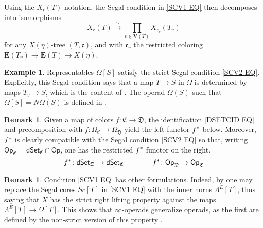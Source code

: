 \documentclass[a4paper,10pt
,draft
]{article}%
\numberwithin{equation}{section}
\numberwithin{figure}{section}
\theoremstyle{definition} %
\newtheorem{example}[equation]{Example}%
\newtheorem{remark}[equation]{Remark}%
\newcommand{\Op}{\mathsf{Op}}%
\newcommand{\dSet}{\mathsf{dSet}}
\newcommand{\1}{\ensuremath{\mathbbm 1}}%
\begin{document}
Using the $X_{\mathfrak c}(T)$ notation, 
the Segal condition in \eqref{SCV1 EQ}
then decomposes into isomorphisms
	\begin{equation}\label{SCV2 EQ}
	X_{\mathfrak c}(T) \xrightarrow{\simeq} \prod_{v \in \boldsymbol{V}(T)} X_{\mathfrak c_v}(T_v)
	\end{equation}
for any $X(\eta)$-tree $(T,\mathfrak{c})$,
and with $\mathfrak{c}_v$
the restricted coloring
$\boldsymbol{E}(T_v) \to \boldsymbol{E}(T) \to X(\eta)$.


\begin{example}\label{OMTSEG EX}
	Representables $\Omega[S]$ satisfy
	the strict Segal condition \eqref{SCV2 EQ}.
	Explicitly, this Segal condition says
	that a map
	$T\to S$ in $\Omega$ is determined by maps
	$T_v\to S$, 
	which is the content of \cite[Prop. 5.11]{Per18}.
	The operad $\Omega(S)$
	such that $\Omega[S] = N \Omega(S)$
	is defined in \cite[\S 3]{MW07}.
\end{example}



\begin{remark}
Given a map of colors 
$f \colon \mathfrak{C} \to \mathfrak{D}$,
the identification \eqref{DSETCID EQ}
and precomposition with 
$f\colon \Omega_\mathfrak{C} \to \Omega_\mathfrak{D}$
yield the left functor $f^{\**}$ below.
Moreover, $f^{\**}$ is clearly compatible with the Segal condition
\eqref{SCV2 EQ} so that, writing
$\Op_{\mathfrak{C}} = \dSet_{\mathfrak{C}} \cap \Op$,
one has the restricted $f^{\**}$ functor on the right.
\[
f^{\**} \colon \dSet_{\mathfrak{D}} \to \dSet_{\mathfrak{C}}
\qquad \qquad
f^{\**} \colon \Op_{\mathfrak{D}} \to \Op_{\mathfrak{C}}
\]
\end{remark}


\begin{remark}\label{SSCOTHER REM}
	Condition \eqref{SCV1 EQ} has other formulations.
	Indeed, by \cite[Props. 3.22, 3.31]{BP_edss}
	one may replace the Segal cores $Sc[T]$
	in \eqref{SCV1 EQ} with the inner horns $\Lambda^E[T]$,
	thus saying that $X$ has the strict
	right lifting property against the maps
	$\Lambda^E[T] \to \Omega[T]$.
	This shows that $\infty$-operads generalize operads,
	as the first are defined by the 
	non-strict version of this property \cite[\S 5]{MW09}.
\end{remark}
\end{document}
